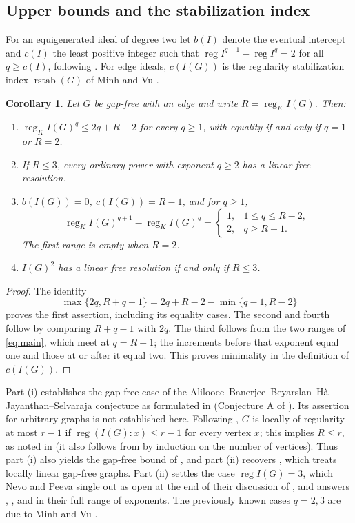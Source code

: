 \documentclass[11pt,a4paper]{article}
\newtheorem{corollary}[theorem]{Corollary}
\theoremstyle{definition}
\newcommand{\reg}{\operatorname{reg}}
\begin{document}
\subsection{Upper bounds and the stabilization index}
For an equigenerated ideal of degree two let $b(I)$ denote the eventual intercept and $c(I)$ the least positive integer such that $\reg I^{q+1}-\reg I^q=2$ for all $q\geq c(I)$, following \cite[Section 4]{BN}. For edge ideals, $c(I(G))$ is the regularity stabilization index $\operatorname{rstab}(G)$ of Minh and Vu \cite[p.~338]{MV}.
\begin{corollary}\label{cor:further}
Let $G$ be gap-free with an edge and write $R=\reg_K I(G)$. Then:
\begin{enumerate}[label=\textup{(\roman*)}]
 \item $\reg_K I(G)^q\leq2q+R-2$ for every $q\geq1$, with equality if and only if $q=1$ or $R=2$.
 \item If $R\leq3$, every ordinary power with exponent $q\geq2$ has a linear free resolution.
 \item $b(I(G))=0$, $c(I(G))=R-1$, and for $q\geq1$,
 \[
  \reg_K I(G)^{q+1}-\reg_K I(G)^q=
  \begin{cases}1,&1\leq q\leq R-2,\\2,&q\geq R-1.\end{cases}
 \]
 The first range is empty when $R=2$.
 \item $I(G)^2$ has a linear free resolution if and only if $R\leq3$.
\end{enumerate}
\end{corollary}
\begin{proof}
The identity
\[
 \max\{2q,R+q-1\}=2q+R-2-\min\{q-1,R-2\}
\]
proves the first assertion, including its equality cases. The second and fourth follow by comparing $R+q-1$ with $2q$. The third follows from the two ranges of \eqref{eq:main}, which meet at $q=R-1$; the increments before that exponent equal one and those at or after it equal two. This proves minimality in the definition of $c(I(G))$.
\end{proof}
Part (i) establishes the gap-free case of the Alilooee--Banerjee--Beyarslan--H\`a--Jayanthan--Selvaraja conjecture as formulated in \cite[Conjecture 1.1]{BN} (Conjecture A of \cite{BBH}). Its assertion for arbitrary graphs is not established here. Following \cite{BBH}, $G$ is locally of regularity at most $r-1$ if $\reg(I(G):x)\leq r-1$ for every vertex $x$; this implies $R\leq r$, as noted in \cite[Section 1]{BBH} (it also follows from \cite[Lemma 3.1]{DHS} by induction on the number of vertices). Thus part (i) also yields the gap-free bound of \cite[Theorem 4.2]{BBH}, and part (ii) recovers \cite[Theorem 4.5]{BBH}, which treats locally linear gap-free graphs. Part (ii) settles the case $\reg I(G)=3$, which Nevo and Peeva single out as open at the end of their discussion of \cite[Open Problems 1.11]{NP}, and answers \cite[Question 1.1]{Ban}, \cite[Conjecture B]{BBH}, and \cite[Conjecture 4.2]{BN} in their full range of exponents. The previously known cases $q=2,3$ are due to Minh and Vu \cite{MV}.
\end{document}
